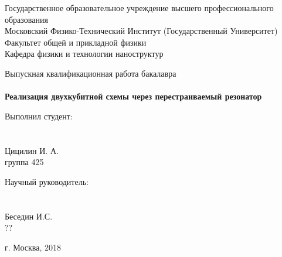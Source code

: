 \documentclass[12pt, twoside]{report}
\begin{document}
\begin{titlepage}
	\begin{center}
Государственное образовательное учреждение высшего профессионального образования\\
Московский Физико-Технический Институт (Государственный Университет)\\
Факультет общей и прикладной физики\\
Кафедра физики и технологии наноструктур\\
	\end{center}

\vspace{5cm}
	\begin{center}
Выпускная квалификационная работа бакалавра\\~\\
\Large \textbf{Реализация двухкубитной схемы через перестраиваемый резонатор}
	\end{center}

\vspace{4cm}

	\begin{center}
		\begin{minipage}{0.45\textwidth}
			\begin{center}
Выполнил студент:\\~\\~\\
Цицилин И. А.\\
группа 425
			\end{center}
		\end{minipage}
		\begin{minipage}{0.45\textwidth}
			\begin{center}
Научный руководитель:\\~\\~\\
Беседин И.С.\\
??
			\end{center}
		\end{minipage}
	\end{center}

\vspace{\fill}


	\begin{center}
г. Москва, 2018
	\end{center}

\end{titlepage}

\end{document}

